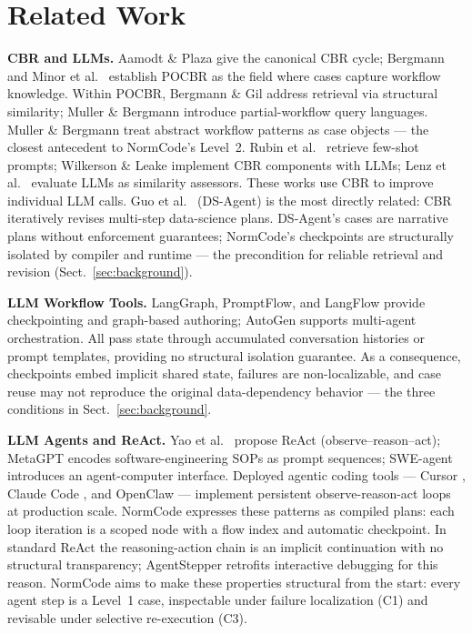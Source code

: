 \section{Related Work}
\label{sec:related}

\textbf{CBR and LLMs.} Aamodt \& Plaza \cite{aamodt1994} give the canonical CBR cycle; Bergmann \cite{bergmann2002}
and Minor et al.\ \cite{minor2014} establish POCBR as the field where cases capture
workflow knowledge. Within POCBR, Bergmann \& Gil \cite{bergmann2014} address retrieval
via structural similarity; Muller \& Bergmann \cite{muller2015a} introduce partial-workflow
query languages. Muller \& Bergmann \cite{muller2015b} treat abstract workflow patterns as case objects
--- the closest antecedent to NormCode's Level~2. Rubin et al.\ \cite{rubin2022} retrieve few-shot prompts; Wilkerson \& Leake
\cite{wilkerson2024} implement CBR components with LLMs; Lenz et al.\ \cite{lenz2025}
evaluate LLMs as similarity assessors. These works use CBR to improve individual LLM
calls. Guo et al.\ \cite{guo2024} (DS-Agent) is the most directly related: CBR
iteratively revises multi-step data-science plans. DS-Agent's cases are narrative plans
without enforcement guarantees; NormCode's checkpoints are structurally isolated by
compiler and runtime --- the precondition for reliable retrieval and revision
(Sect.~\ref{sec:background}).

\textbf{LLM Workflow Tools.} LangGraph, PromptFlow, and LangFlow provide checkpointing and graph-based authoring;
AutoGen \cite{wu2023} supports multi-agent orchestration. All pass state through
accumulated conversation histories or prompt templates, providing no structural
isolation guarantee. As a consequence, checkpoints embed implicit shared state, failures
are non-localizable, and case reuse may not reproduce the original data-dependency
behavior --- the three conditions in Sect.~\ref{sec:background}.

\textbf{LLM Agents and ReAct.} Yao et al.\ \cite{yao2023} propose ReAct (observe--reason--act); MetaGPT \cite{hong2024} encodes
software-engineering SOPs as prompt sequences; SWE-agent \cite{yang2024} introduces an
agent-computer interface. Deployed agentic coding tools --- Cursor \cite{cursor2024},
Claude Code \cite{claudecode2026}, and OpenClaw \cite{openclaw2026} --- implement
persistent observe-reason-act loops at production scale. NormCode expresses these
patterns as compiled plans: each loop iteration is a scoped node with a flow index and
automatic checkpoint. In standard ReAct the reasoning-action chain is an implicit
continuation with no structural transparency; AgentStepper \cite{agentstepper2026}
retrofits interactive debugging for this reason. NormCode aims to make these properties
structural from the start: every agent step is a Level~1 case, inspectable under
failure localization (C1) and revisable under selective re-execution (C3).

